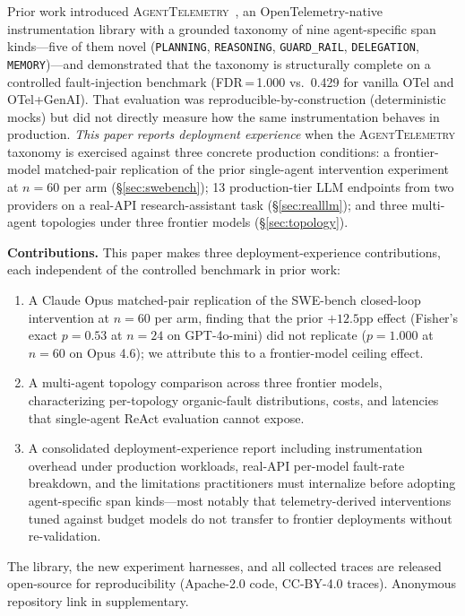 \documentclass[11pt]{article}
\begin{document}
Prior work introduced \textsc{AgentTelemetry}~\citep{aiware2026}, an
OpenTelemetry-native instrumentation library with a grounded taxonomy
of nine agent-specific span kinds---five of them novel
(\texttt{PLANNING}, \texttt{REASONING}, \texttt{GUARD\_RAIL},
\texttt{DELEGATION}, \texttt{MEMORY})---and demonstrated that the
taxonomy is structurally complete on a controlled fault-injection
benchmark (FDR\,=\,1.000 vs.\ 0.429 for vanilla OTel and OTel+GenAI).
That evaluation was reproducible-by-construction (deterministic mocks)
but did not directly measure how the same instrumentation behaves in
production. \emph{This paper reports deployment experience} when the
\textsc{AgentTelemetry} taxonomy is exercised against three concrete
production conditions: a frontier-model matched-pair replication of
the prior single-agent intervention experiment at $n{=}60$ per arm
(\S\ref{sec:swebench}); 13 production-tier LLM endpoints from two
providers on a real-API research-assistant task
(\S\ref{sec:realllm}); and three multi-agent topologies under three
frontier models (\S\ref{sec:topology}).

\textbf{Contributions.} This paper makes three deployment-experience
contributions, each independent of the controlled benchmark in prior
work:

\begin{enumerate}[leftmargin=*,nosep]
\item A Claude Opus matched-pair replication of the SWE-bench
  closed-loop intervention at $n{=}60$ per arm, finding that the
  prior $+12.5$pp effect (Fisher's exact $p{=}0.53$ at $n{=}24$ on
  GPT-4o-mini) did not replicate ($p{=}1.000$ at $n{=}60$ on Opus
  4.6); we attribute this to a frontier-model ceiling effect.
\item A multi-agent topology comparison across three frontier models,
  characterizing per-topology organic-fault distributions, costs, and
  latencies that single-agent ReAct evaluation cannot expose.
\item A consolidated deployment-experience report including
  instrumentation overhead under production workloads, real-API
  per-model fault-rate breakdown, and the limitations practitioners
  must internalize before adopting agent-specific span kinds---most
  notably that telemetry-derived interventions tuned against budget
  models do not transfer to frontier deployments without
  re-validation.
\end{enumerate}

The library, the new experiment harnesses, and all collected traces
are released open-source for reproducibility (Apache-2.0 code,
CC-BY-4.0 traces). Anonymous repository link in supplementary.
\end{document}

